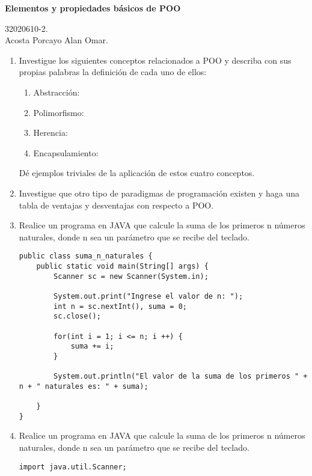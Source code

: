 \documentclass[12pt]{article}
\begin{document}
    \begin{center}
        \large \textbf{Elementos y propiedades básicos de POO}
    \end{center}
    
    \begin{flushright}
        32020610-2. \\
        Acosta Porcayo Alan Omar.
    \end{flushright}

    \begin{enumerate}
        \item Investigue los siguientes conceptos relacionados a POO y describa con sus propias palabras la definición de cada uno de ellos:
        \begin{enumerate}
            \item Abstracción:
            \item Polimorfismo:
            \item Herencia:
            \item Encapsulamiento:
        \end{enumerate}
        Dé ejemplos triviales de la aplicación de estos cuatro conceptos.

        \item Investigue que otro tipo de paradigmas de programación existen y haga una tabla de ventajas y desventajas con respecto a POO.

        \item Realice un programa en JAVA que calcule la suma de los primeros n números naturales, donde n sea un parámetro que se recibe del teclado. 
        \begin{lstlisting}
public class suma_n_naturales {
    public static void main(String[] args) {
        Scanner sc = new Scanner(System.in);

        System.out.print("Ingrese el valor de n: ");
        int n = sc.nextInt(), suma = 0;
        sc.close();

        for(int i = 1; i <= n; i ++) {
            suma += i;
        }

        System.out.println("El valor de la suma de los primeros " + n + " naturales es: " + suma);

    }
}
        \end{lstlisting}

        \item Realice un programa en JAVA que calcule la suma de los primeros n números naturales, donde n sea un parámetro que se recibe del teclado. 
        \begin{lstlisting}
import java.util.Scanner;


\end{lstlisting}
\end{enumerate}
\end{document}

